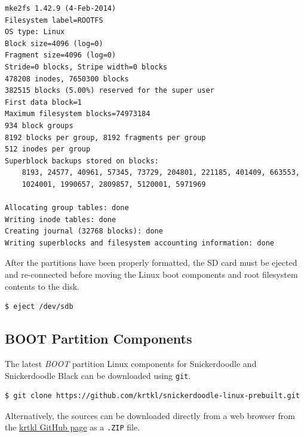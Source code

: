 \begin{lstlisting}[style=text]
mke2fs 1.42.9 (4-Feb-2014)
Filesystem label=ROOTFS
OS type: Linux
Block size=4096 (log=0)
Fragment size=4096 (log=0)
Stride=0 blocks, Stripe width=0 blocks
478208 inodes, 7650300 blocks
382515 blocks (5.00%) reserved for the super user
First data block=1
Maximum filesystem blocks=74973184
934 block groups
8192 blocks per group, 8192 fragments per group
512 inodes per group
Superblock backups stored on blocks: 
	8193, 24577, 40961, 57345, 73729, 204801, 221185, 401409, 663553, 
	1024001, 1990657, 2809857, 5120001, 5971969

Allocating group tables: done                            
Writing inode tables: done                            
Creating journal (32768 blocks): done
Writing superblocks and filesystem accounting information: done   
\end{lstlisting}


After the partitions have been properly formatted, the SD card must be ejected and re-connected before moving the Linux boot components and root filesystem contents to the disk.


\begin{lstlisting}
$ eject /dev/sdb
\end{lstlisting}


\subsection{BOOT Partition Components}

The latest \textit{BOOT} partition Linux components for Snickerdoodle and Snickerdoodle Black can be downloaded using \texttt{git}.


\begin{fullwidth}
\begin{lstlisting}[style=text]
$ git clone https://github.com/krtkl/snickerdoodle-linux-prebuilt.git
\end{lstlisting}
\end{fullwidth}


Alternatively, the sources can be downloaded directly from a web browser from the \href{https://github.com/krtkl/snickerdoodle-linux-prebuilt}{krtkl GitHub page} as a \texttt{.ZIP} file.



